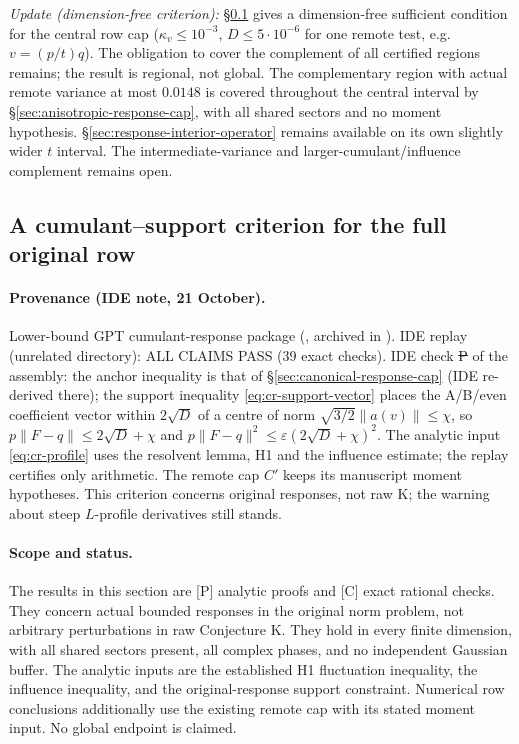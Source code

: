 \emph{Update (dimension-free criterion):} \S\ref{sec:cumulant-response-cap} gives a dimension-free sufficient condition for the central row cap
($\kappa_v\le10^{-3}$, $D\le5\cdot10^{-6}$ for one remote test, e.g.\ $v=(p/t)q$). The obligation to cover the complement of all certified regions remains; the result
is regional, not global. The complementary region with actual remote variance at most $0.0148$ is covered throughout the central interval by \S\ref{sec:anisotropic-response-cap},
with all shared sectors and no moment hypothesis. \S\ref{sec:response-interior-operator} remains available on its own slightly wider $t$ interval. The intermediate-variance
and larger-cumulant/influence complement remains open.

\subsection{A cumulant--support criterion for the full original row}
\label{sec:cumulant-response-cap}
\paragraph{Provenance (IDE note, 21 October).} Lower-bound GPT cumulant-response package (, archived in
). IDE replay  (unrelated directory): ALL CLAIMS PASS (39 exact checks). IDE check
\st{P} of the assembly: the anchor inequality is that of \S\ref{sec:canonical-response-cap} (IDE re-derived there); the support inequality \eqref{eq:cr-support-vector} places
the A/B/even coefficient vector within $2\sqrt D$ of a centre of norm $\sqrt{3/2}\|a(v)\|\le\chi$, so $p\|F-q\|\le2\sqrt D+\chi$ and $p\|F-q\|^2\le\varepsilon(2\sqrt D+\chi)^2$.
The analytic input \eqref{eq:cr-profile} uses the resolvent lemma, H1 and the influence estimate; the replay certifies only arithmetic. The remote cap $C'$ keeps its
manuscript moment hypotheses. This criterion concerns original responses, not raw K; the warning about steep $L$-profile derivatives still stands.


\paragraph{Scope and status.}
The results in this section are [P] analytic proofs and [C] exact rational
checks. They concern actual bounded responses in the original norm problem,
not arbitrary perturbations in raw Conjecture K. They hold in every finite
dimension, with all shared sectors present, all complex phases, and no
independent Gaussian buffer. The analytic inputs are the established H1
fluctuation inequality, the influence inequality, and the original-response
support constraint. Numerical row conclusions additionally use the existing
remote cap with its stated moment input. No global endpoint is claimed.

